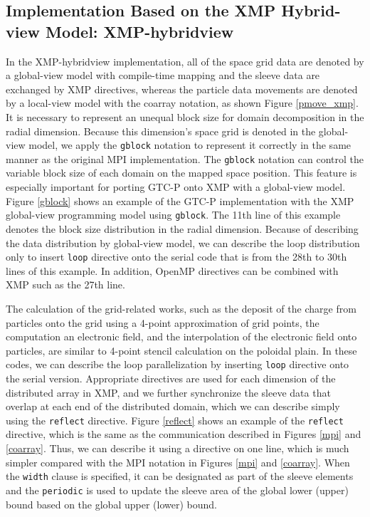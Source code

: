 \subsection{Implementation Based on the XMP Hybrid-view Model: XMP-hybridview}
In the XMP-hybridview implementation, all of the space grid data are denoted by a global-view model with compile-time mapping and the sleeve data are exchanged by XMP directives, whereas the particle data movements are denoted by a local-view model with the coarray notation, as shown Figure \ref{pmove_xmp}.
It is necessary to represent an unequal block size for domain decomposition in the radial dimension. Because this dimension's space grid is denoted in the global-view model, we apply the {\tt gblock} notation to represent it correctly in the same manner as the original MPI implementation. The {\tt gblock} notation can control the variable block size of each domain on the mapped space position. This feature is especially important for porting GTC-P onto XMP with a global-view model. Figure \ref{gblock} shows an example of the GTC-P implementation with the XMP global-view programming model using {\tt gblock}. The 11th line of this example denotes the block size distribution in the radial dimension. Because of describing the data distribution by global-view model, we can describe the loop distribution only to insert \texttt{loop} directive onto the serial code that is from the 28th to 30th lines of this example. In addition, OpenMP directives can be combined with XMP such as the 27th line.

The calculation of the grid-related works, such as the deposit of the charge from particles onto the grid using a 4-point approximation of grid points, the computation an electronic field, and the interpolation of the electronic field onto particles, are similar to 4-point stencil calculation on the poloidal plain. In these codes, we can describe the loop parallelization by inserting {\tt loop} directive onto the serial version. Appropriate directives are used for each dimension of the distributed array in XMP, and we further synchronize the sleeve data that overlap at each end of the distributed domain, which we can describe simply using the {\tt reflect} directive. Figure \ref{reflect} shows an example of the {\tt reflect} directive, which is the same as the communication described in Figures \ref{mpi} and \ref{coarray}. Thus, we can describe it using a directive on one line, which is much simpler compared with the MPI notation in Figures \ref{mpi} and \ref{coarray}. When the {\tt width} clause is specified, it can be designated as part of the sleeve elements and the {\tt periodic} is used to update the sleeve area of the global lower (upper) bound based on the global upper (lower) bound.


